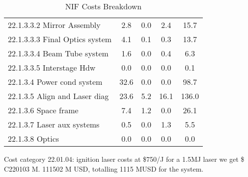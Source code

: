 \begin{table}[h!]
{\begin{tabular}{lcccc}
\hspace{10mm}22.1.3.3.2 Mirror Assembly & 2.8 & 0.0 & 2.4 & 15.7 \\
\hspace{10mm}22.1.3.3.3 Final Optics system & 4.1 & 0.1 & 0.3 & 13.7 \\
\hspace{10mm}22.1.3.3.4 Beam Tube system & 1.6 & 0.0 & 0.4 & 6.3 \\
\hspace{10mm}22.1.3.3.5 Interstage Hdw & 0.0 & 0.0 & 0.0 & 0.1 \\
\hspace{5mm}22.1.3.4 Power cond system & 32.6 & 0.0 & 0.0 & 98.7 \\
\hspace{5mm}22.1.3.5 Align and Laser diag & 23.6 & 5.2 & 16.1 & 136.0 \\
\hspace{5mm}22.1.3.6 Space frame & 7.4 & 1.2 & 0.0 & 26.1 \\
\hspace{5mm}22.1.3.7 Laser aux systems & 0.5 & 0.0 & 1.3 & 5.5 \\
\hspace{5mm}22.1.3.8 Optics & 0.0 & 0.0 & 0.0 & 0.0 \\
\hline
\end{tabular}}
\caption{NIF Costs Breakdown}
\label{tab:nif_costs}
\end{table}



Cost category 22.01.04: ignition laser costs at  \$750/J for a 1.5MJ laser we get \$ C220103 M. 111502 M USD, totalling 1115 MUSD for the system.



